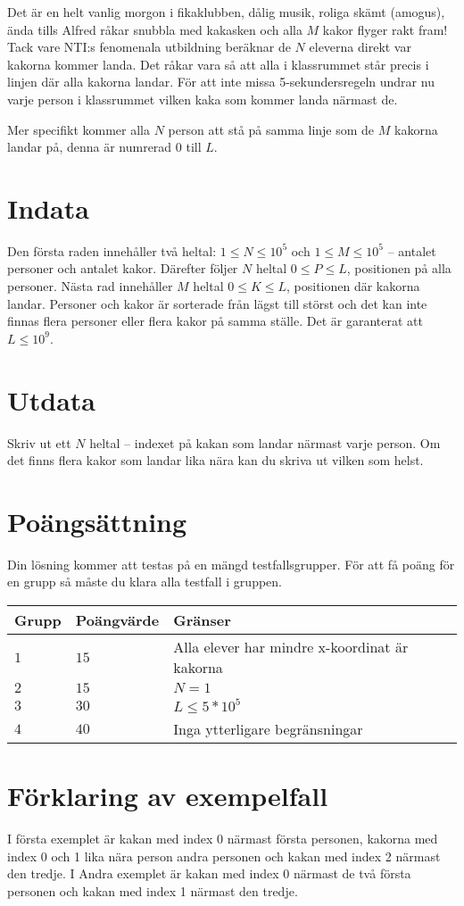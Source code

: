 Det är en helt vanlig morgon i fikaklubben, dålig musik, roliga skämt (amogus), ända tills Alfred råkar snubbla med kakasken och alla $M$ kakor flyger rakt fram!
Tack vare NTI:s fenomenala utbildning beräknar de $N$ eleverna direkt var kakorna kommer landa. Det råkar vara så att alla i klassrummet står precis i linjen där alla kakorna landar.
För att inte missa 5-sekundersregeln undrar nu varje person i klassrummet vilken kaka som kommer landa närmast de. 

Mer specifikt kommer alla $N$ person att stå på samma linje som de $M$ kakorna landar på, denna är numrerad 0 till $L$.


\section*{Indata}
Den första raden innehåller två heltal: $1\leq N \leq 10^5$ och $1 \leq M \leq 10^5$ -- antalet personer och antalet kakor. 
Därefter följer $N$ heltal $0 \leq P \leq L$, positionen på alla personer.
Nästa rad innehåller $M$ heltal $0 \leq K \leq L$, positionen där kakorna landar.
Personer och kakor är sorterade från lägst till störst och det kan inte finnas flera personer eller flera kakor på samma ställe.
Det är garanterat att $L \leq 10^9$.

\section*{Utdata}
Skriv ut ett $N$ heltal -- indexet på kakan som landar närmast varje person. Om det finns flera kakor som landar lika nära kan du skriva ut vilken som helst.

\section*{Poängsättning}
Din lösning kommer att testas på en mängd testfallsgrupper.
För att få poäng för en grupp så måste du klara alla testfall i gruppen.

\noindent
\begin{tabular}{| l | l | p{12cm} |}
  \hline
  Grupp & Poängvärde & Gränser \\ \hline
  $1$   & $15$       & Alla elever har mindre x-koordinat är kakorna \\ \hline
  $2$   & $15$       & $N=1$ \\ \hline
  $3$   & $30$       & $L \leq 5*10^5$ \\ \hline
  $4$   & $40$       & Inga ytterligare begränsningar  \\ \hline
\end{tabular}

\section*{Förklaring av exempelfall}
I första exemplet är kakan med index 0 närmast första personen, kakorna med index 0 och 1 lika nära person andra personen och kakan med index 2 närmast den tredje.
I Andra exemplet är kakan med index 0 närmast de två första personen och kakan med index 1 närmast den tredje.